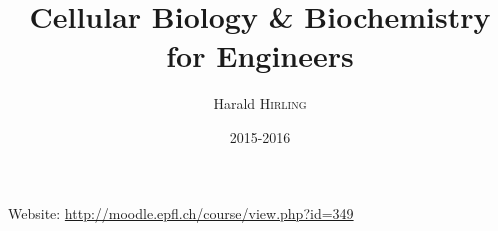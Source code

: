 

\title{Cellular Biology \& Biochemistry for Engineers}
\author{Harald \textsc{Hirling}}
\date{2015-2016}


\maketitle
\tableofcontents

\newpage


Website: \url{http://moodle.epfl.ch/course/view.php?id=349}





\nocite{*}







